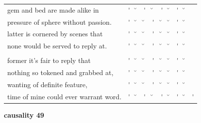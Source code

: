 \documentclass[12pt, landscape]{article}
\begin{document}
\begin{center}
\begin{tabularx}{\textwidth}{
>{\lefting\arraybackslash}X
c
c
c
c
c
c
c
c
c
}

gem and bed are made alike in & \'{} & \u{} & \'{} & \u{} & \'{} & \u{} & \'{} & \u{} & \\
pressure of sphere without passion. & \'{} & \u{} & \u{} & \'{} & \u{} & \u{} & \'{} & \u{} & \\
latter is cornered by scenes that & \'{} & \u{} & \u{} & \'{} & \u{} & \u{} & \'{} & \u{} & \\
none would be served to reply at. & \'{} & \u{} & \u{} & \'{} & \u{} & \u{} & \'{} & \u{} & \\
 & & & & & & & & \\
former it's fair to reply that & \'{} & \u{} & \u{} & \'{} & \u{} & \u{} & \'{} & \u{} & \\
nothing so tokened and grabbed at, & \'{} & \u{} & \u{} & \'{} & \u{} & \u{} & \'{} & \u{} & \\
wanting of definite feature, & \'{} & \u{} & \u{} & \'{} & \u{} & \u{} & \'{} & \u{} & \\
time of mine could ever warrant word. & \'{} & \u{} & \'{} & \u{} & \'{} & \u{} & \'{} & \u{} & \'{} \\

\end{tabularx}
\end{center}

\vspace*{\fill}

\newpage

\vspace*{\fill}

\noindent \textbf{causality 49}
\noindent \hfill \par
\end{document}
